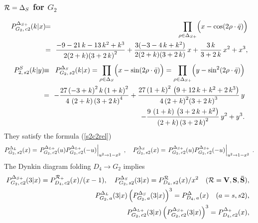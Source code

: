 \documentclass[a4paper,12pt]{article}
\newcommand{\vT}{\vphantom{\mbox{\twozero I}}}
\begin{document}
\subsubsection{${\cal R}=\Delta_S$ for $G_2$}

\begin{eqnarray}
   P_{G_2,\,c2}^{\Delta_{S+}}(k|x)&\!\!=\!\!&\prod_{\rho\in{\Delta_{S+}}}
   \Bigl(x-\cos(2\rho\cdot\bar{q})\Bigr)\nonumber\\
%
   &\!\!=\!\!&\frac{-9 - 21\,k - 13\,k^2 + k^3}
     {2(2 + k){( 3 + 2\,k)}^2} +
     \frac{3(-3 - 4\,k + k^2)}
     {2( 2 + k)( 3 + 2\,k)} \,x +
    \frac{3\,k}{3 + 2\,k}\,x^2 + x^3,
\end{eqnarray}
\begin{eqnarray}
   P_{2,\,s2}^S(k|y)&\!\!\equiv\!\!&P_{G_2,\,s2}^{\Delta_{S}}(k|x)
   =\prod_{\rho\in{\Delta_{S}}}\Bigl(x-\sin(2\rho\cdot\bar{q})\Bigr)
   =\prod_{\rho\in{\Delta_{S+}}}\Bigl(y-\sin^2(2\rho\cdot\bar{q})\Bigr)
   \nonumber\\
%
   &\!\!=\!\!&-\frac{27\,{\left( -3 + k \right) }^2\,k\,
       {\left( 1 + k \right) }^2}{4\,\left( 2 + k \right)%
       {\left( 3 + 2\,k \right) }^4} +
    \frac{27\,{\left( 1 + k \right) }^2\,
       \left( 9 + 12\,k + k^2 + 2\,k^3 \right)}{4\,
       {\left( 2 + k \right) }^2{\left( 3 + 2\,k \right) }^3}
   \,y\nonumber\\
   &&
     - \frac{9\,\left( 1 + k \right) \,
       \left( 3 + 2\,k + k^2 \right)}{\left( 2 + k
         \right){\left( 3 + 2\,k \right)}^2}\,y^2 + y^3.
\end{eqnarray}
They satisfy the formula (\ref{s2c2rel})
\begin{equation}
   P_{G_2,\,s2}^{{\Delta}_L}(x)=
   \left.\vT P_{G_2,\,c2}^{{\Delta}_{L+}}(u)P_{G_2,\,c2}^{{\Delta}_{L+}}(-u)
   \right|_{u^2\to1-x^2}\;,\quad
   P_{G_2,\,s2}^{{\Delta}_S}(x)=
   \left.\vT P_{G_2,\,c2}^{{\Delta}_{S+}}(u)P_{G_2,\,c2}^{{\Delta}_{S+}}(-u)
   \right|_{u^2\to1-x^2}\;.
\end{equation}
The Dynkin diagram folding $D_4\to G_2$ implies
\begin{eqnarray}
   &&\hspace{-5mm}
   P_{G_2,\,c2}^{\Delta_{S+}}(3|x)=P_{D_4,\,c2}^{{\cal R}_+}(x)/(x-1),\quad
   P_{G_2,\,s2}^{\Delta_S}(3|x)=P_{D_4,\,s2}^{{\cal R}}(x)/x^2
   \quad({\cal R}={\bf V},{\bf S},{\bf \bar{S}}),\\
%
   &&\hspace{-5mm}
   P_{G_2,\,a}^{\Delta_L}(3|x)\left(P_{G_2,\,a}^{\Delta_S}(3|x)\right)^3
   =P_{D_4,\,a}^{\Delta}(x)\quad(a=s,s2),
   \label{trid4g2}\\
%
   &&\hspace{-5mm}
   P_{G_2,\,c2}^{\Delta_{L+}}(3|x)
   \left(P_{G_2,\,c2}^{\Delta_{S+}}(3|x)\right)^3
   =P_{D_4,\,c2}^{\Delta_+}(x),
\end{eqnarray}
\end{document}

